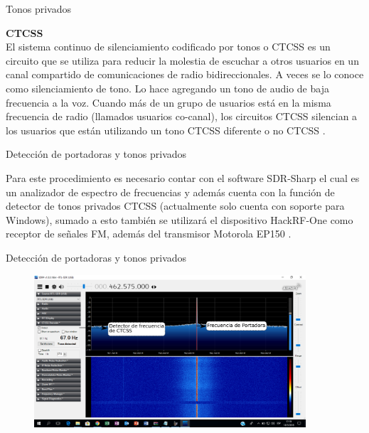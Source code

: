 \begin{frame}{Tonos privados}

\textbf{CTCSS}\\
\vspace{3mm}
El sistema continuo de silenciamiento codificado por tonos o CTCSS es un circuito que se utiliza para reducir la molestia de escuchar a otros usuarios en un canal compartido de comunicaciones de radio bidireccionales. A veces se lo conoce como silenciamiento de tono. Lo hace agregando un tono de audio de baja frecuencia a la voz. Cuando más de un grupo de usuarios está en la misma frecuencia de radio (llamados usuarios co-canal), los circuitos CTCSS silencian a los usuarios que están utilizando un tono CTCSS diferente o no CTCSS \cite{Wikipedia2018}.
\end{frame}

\begin{frame}{Detección de portadoras y tonos privados}

Para este procedimiento es necesario contar con el software SDR-Sharp el cual es un analizador de espectro de frecuencias y además cuenta con la función de detector de tonos privados CTCSS (actualmente solo cuenta con soporte para Windows), sumado a esto también se utilizará el dispositivo HackRF-One como receptor de señales FM, además del transmisor Motorola EP150 \cite{Airspy2018}.

\end{frame}

\begin{frame}{Detección de portadoras y tonos privados}

\begin{figure}[H]
\centering
\vspace{-3mm}
\includegraphics[width=0.9\textwidth]{parte3/lab14/pdf/Lab14_1.pdf}
\end{figure}

\end{frame}

